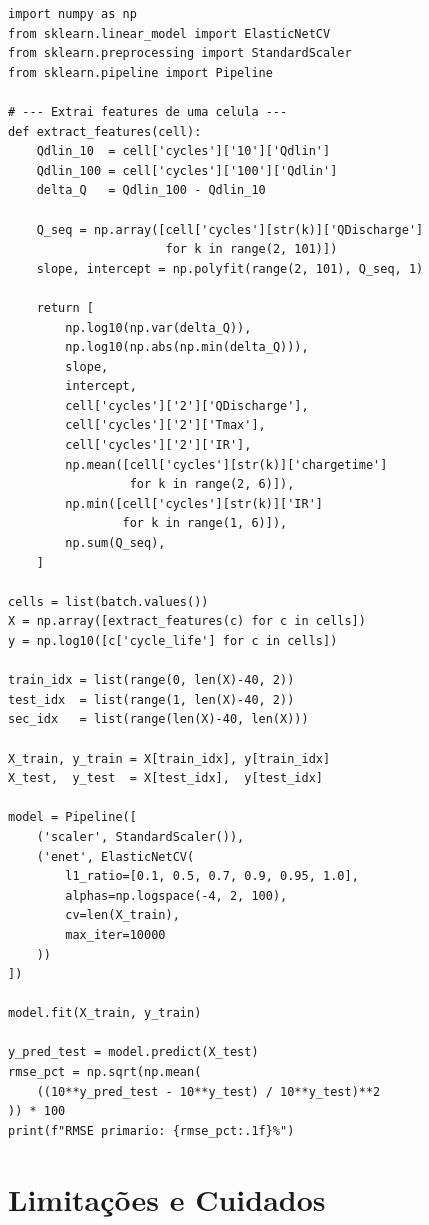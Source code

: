 \documentclass[12pt,a4paper]{article}
\begin{document}
\begin{lstlisting}[style=python, caption={Pipeline de treinamento com Elastic Net}]
import numpy as np
from sklearn.linear_model import ElasticNetCV
from sklearn.preprocessing import StandardScaler
from sklearn.pipeline import Pipeline

# --- Extrai features de uma celula ---
def extract_features(cell):
    Qdlin_10  = cell['cycles']['10']['Qdlin']
    Qdlin_100 = cell['cycles']['100']['Qdlin']
    delta_Q   = Qdlin_100 - Qdlin_10

    Q_seq = np.array([cell['cycles'][str(k)]['QDischarge']
                      for k in range(2, 101)])
    slope, intercept = np.polyfit(range(2, 101), Q_seq, 1)

    return [
        np.log10(np.var(delta_Q)),
        np.log10(np.abs(np.min(delta_Q))),
        slope,
        intercept,
        cell['cycles']['2']['QDischarge'],
        cell['cycles']['2']['Tmax'],
        cell['cycles']['2']['IR'],
        np.mean([cell['cycles'][str(k)]['chargetime']
                 for k in range(2, 6)]),
        np.min([cell['cycles'][str(k)]['IR']
                for k in range(1, 6)]),
        np.sum(Q_seq),
    ]

cells = list(batch.values())
X = np.array([extract_features(c) for c in cells])
y = np.log10([c['cycle_life'] for c in cells])

train_idx = list(range(0, len(X)-40, 2))
test_idx  = list(range(1, len(X)-40, 2))
sec_idx   = list(range(len(X)-40, len(X)))

X_train, y_train = X[train_idx], y[train_idx]
X_test,  y_test  = X[test_idx],  y[test_idx]

model = Pipeline([
    ('scaler', StandardScaler()),
    ('enet', ElasticNetCV(
        l1_ratio=[0.1, 0.5, 0.7, 0.9, 0.95, 1.0],
        alphas=np.logspace(-4, 2, 100),
        cv=len(X_train),
        max_iter=10000
    ))
])

model.fit(X_train, y_train)

y_pred_test = model.predict(X_test)
rmse_pct = np.sqrt(np.mean(
    ((10**y_pred_test - 10**y_test) / 10**y_test)**2
)) * 100
print(f"RMSE primario: {rmse_pct:.1f}%")
\end{lstlisting}

\section{Limita\c{c}\~oes e Cuidados}
\end{document}
